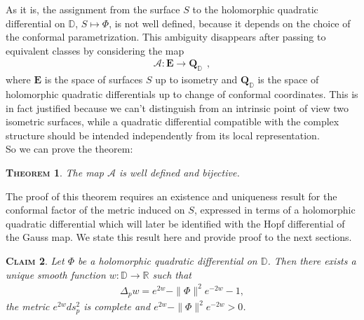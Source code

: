 \documentclass[a4paper,11pt,openright,twoside]{book}
\newcommand{\1}{\mathds{1}}
\theoremstyle{plain}
\newtheorem{thm}{\textsc{Theorem}}[chapter]
\newtheorem{claim}[thm]{\textsc{Claim}}
\theoremstyle{definition}
\theoremstyle{remark}
\begin{document}
As it is, the assignment from the surface $S$ to the holomorphic quadratic differential on $\mathbb{D}$, $S\mapsto \Phi$, is not well defined, because it depends on the choice of the conformal parametrization. This ambiguity disappears after passing to equivalent classes by considering the map
\begin{align*}
	\mathscr{A} : \mathbf{E} \to \mathbf{Q}_{\mathbb{D}}
\ \ , 
\end{align*}
where $\mathbf{E}$ is the space of surfaces $S$ up to isometry and $\mathbf{Q}_{\mathbb{D}}$ is the space of holomorphic quadratic differentials up to change of conformal coordinates. This is in fact justified because we can't distinguish from an intrinsic point of view two isometric surfaces, while a quadratic differential compatible with the complex structure should be intended independently from its local representation.\\
So we can prove the theorem:
\begin{thm}\label{th:class}
	The map $\mathscr{A}$ is well defined and bijective.
\end{thm}
The proof of this theorem requires an existence and uniqueness result for the conformal factor of the metric induced on $S$, expressed in terms of a holomorphic quadratic differential which will later be identified with the Hopf differential of the Gauss map. We state this result here and provide proof to the next sections.
\begin{claim}\label{cl:existenceuniquew}
	Let $\Phi$ be a holomorphic quadratic differential on $\mathbb{D}$. Then there exists a unique smooth function $w:\mathbb{D}\to\mathbb{R}$ such that
	\begin{align*}
		\Delta_p w = e^{2w}-\|\Phi\|^2e^{-2w}-1,
	\end{align*}
	the metric $e^{2w}ds_p^2$ is complete and $e^{2w}-\|\Phi\|^2e^{-2w}>0$.
\end{claim}
\end{document}
